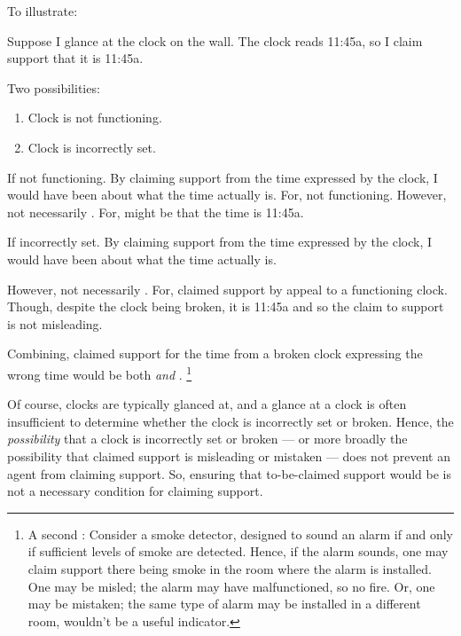 \begin{note}[M\&M \illu{2}]
  To illustrate:

  \begin{illustration}[Clock]
    \label{illu:mom:clock}
    Suppose I glance at the clock on the wall. The clock reads 11:45a, so I claim support that it is 11:45a.
  \end{illustration}

  Two possibilities:
  \begin{enumerate}
  \item Clock is not functioning.
  \item Clock is incorrectly set.
  \end{enumerate}

  If not functioning.
  By claiming support from the time expressed by the clock, I would have been \emph{\misled{}} about what the time actually is.
  For, not functioning.
  However, not necessarily \mistaken{}.
  For, might be that the time is 11:45a.

  If incorrectly set.
  By claiming support from the time expressed by the clock, I would have been \emph{\mistaken{}} about what the time actually is.

  However, not necessarily \misled{}.
  For, claimed support by appeal to a functioning clock.
  Though, despite the clock being broken, it is 11:45a and so the claim to support is not misleading.

  Combining, claimed support for the time from a broken clock expressing the wrong time would be both \misled{} \emph{and} \mistaken{}.\nolinebreak
  \footnote{
    A second :
    Consider a smoke detector, designed to sound an alarm if and only if sufficient levels of smoke are detected.
    Hence, if the alarm sounds, one may claim support there being smoke in the room where the alarm is installed.
    One may be misled; the alarm may have malfunctioned, so no fire.
    Or, one may be mistaken; the same type of alarm may be installed in a different room, wouldn't be a useful indicator.
  }

  {
    \color{red}
    Of course, clocks are typically glanced at, and a glance at a clock is often insufficient to determine whether the clock is incorrectly set or broken.
    Hence, the \emph{possibility} that a clock is incorrectly set or broken --- or more broadly the possibility that claimed support is misleading or mistaken --- does not prevent an agent from claiming support.
    So, ensuring that to-be-claimed support would be \mom{} is not a necessary condition for claiming support.
  }
\end{note}

